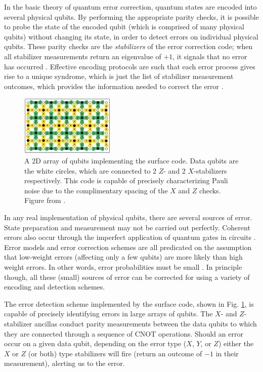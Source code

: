 In the basic theory of quantum error correction, quantum states are encoded into
several physical qubits. By performing the appropriate parity checks, it is
possible to probe the state of the encoded qubit (which is comprised of many
physical qubits) without changing its state, in order to detect errors on
individual physical qubits. These parity checks are the \textit{stabilizers} of
the error correction code; when all stabilizer measurements return an eigenvalue
of $+1$, it signals that no error has occurred \cite{nielsen_chuang_2010}.
Effective encoding protocols are such that each error process gives rise to a
unique syndrome, which is just the list of stabilizer measurement outcomes,
which provides the information needed to correct the error \cite{fowler12_surfac_codes}.

\begin{figure}
  \centering
  \includegraphics[width=0.4\textwidth]{images/surface_code.png}
  \caption{A 2D array of qubits implementing the surface code. Data qubits are
    the white circles, which are connected to 2 $Z$- and 2 $X$-stabilizers
    respectively. This code is capable of precisely characterizing Pauli noise
    due to the complimentary spacing of the $X$ and $Z$ checks. Figure from
    \cite{fowler12_surfac_codes}.}
  \label{fig:surface_code}
\end{figure}

In any real implementation of physical qubits, there are several sources of
error. State preparation and measurement may not be carried out perfectly.
Coherent errors also occur through the imperfect application of quantum gates in
circuits \cite{Devitt_2013}. Error models and error correction schemes are all
predicated on the assumption that low-weight errors (affecting only a few
qubits) are more likely than high weight errors. In other words, error
probabilities must be small \cite{terhal15}. In principle though, all these
(small) sources of error can be corrected for using a variety of encoding and
detection schemes.

The error detection scheme implemented by the surface code, shown in Fig.
\ref{fig:surface_code}, is capable of precisely identifying errors in large
arrays of qubits. The $X$- and $Z$-stabilizer ancillas conduct parity
measurements between the data qubits to which they are connected through a
sequence of CNOT operations. Should an error occur on a given data qubit,
depending on the error type ($X$, $Y$, or $Z$) either the $X$ or $Z$ (or both)
type stabilizers will fire (return an outcome of $-1$ in their measurement),
alerting us to the error.

